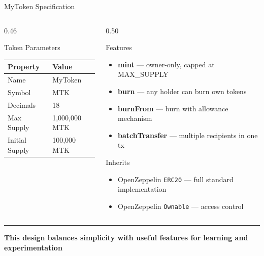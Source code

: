 \documentclass[8pt,aspectratio=169]{beamer}
\newcommand{\bottomnote}[1]{\vfill\vspace{-2mm}\textcolor{mllavender2}{\rule{\textwidth}{0.4pt}}\vspace{1mm}\footnotesize\textbf{#1}}
\begin{document}
\begin{frame}{MyToken Specification}
  \begin{columns}[T]
    \begin{column}{0.46\textwidth}
      \begin{block}{Token Parameters}
        \vspace{2pt}
        \begin{tabular}{@{}ll@{}}
          \toprule
          \textbf{Property} & \textbf{Value} \\
          \midrule
          Name        & MyToken \\
          Symbol      & MTK \\
          Decimals    & 18 \\
          Max Supply  & 1{,}000{,}000 MTK \\
          Initial Supply & 100{,}000 MTK \\
          \bottomrule
        \end{tabular}
      \end{block}
    \end{column}
    \begin{column}{0.50\textwidth}
      \begin{block}{Features}
        \begin{itemize}\setlength\itemsep{2pt}
          \item \textbf{mint} --- owner-only, capped at MAX\_SUPPLY
          \item \textbf{burn} --- any holder can burn own tokens
          \item \textbf{burnFrom} --- burn with allowance mechanism
          \item \textbf{batchTransfer} --- multiple recipients in one tx
        \end{itemize}
      \end{block}
      \vspace{4pt}
      \begin{block}{Inherits}
        \begin{itemize}\setlength\itemsep{2pt}
          \item OpenZeppelin \texttt{ERC20} --- full standard implementation
          \item OpenZeppelin \texttt{Ownable} --- access control
        \end{itemize}
      \end{block}
    \end{column}
  \end{columns}
  \bottomnote{This design balances simplicity with useful features for learning and experimentation}
\end{frame}
\end{document}
